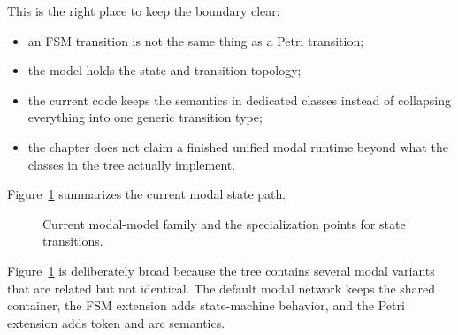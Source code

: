 This is the right place to keep the boundary clear:
\begin{itemize}
\item an FSM transition is not the same thing as a Petri transition;
\item the model holds the state and transition topology;
\item the current code keeps the semantics in dedicated classes instead of
  collapsing everything into one generic transition type;
\item the chapter does not claim a finished unified modal runtime beyond what
  the classes in the tree actually implement.
\end{itemize}

Figure~\ref{fig:modal-state-transitions} summarizes the current modal state
path.

\begin{figure}[htbp]
\centering
\caption{Current modal-model family and the specialization points for state transitions.}
\label{fig:modal-state-transitions}
\end{figure}

Figure~\ref{fig:modal-state-transitions} is deliberately broad because the tree
contains several modal variants that are related but not identical. The default
modal network keeps the shared container, the FSM extension adds state-machine
behavior, and the Petri extension adds token and arc semantics.

